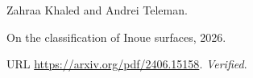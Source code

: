 Zahraa Khaled and Andrei Teleman.

\newblock On the classification of {Inoue} surfaces, 2026{}.

\newblock URL \url{https://arxiv.org/pdf/2406.15158}.
\newblock \emph{Verified}.

